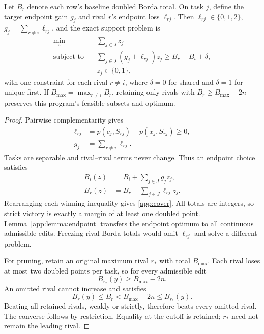 \begin{appprop}
\label{app:prop:borda}
Let $B_r$ denote each row's baseline doubled Borda total. On task $j$, define the target endpoint gain $g_j$ and rival $r$'s endpoint loss $\ell_{rj}$. Then $\ell_{rj}\in\{0,1,2\}$, $g_j=\sum_{r\ne i}\ell_{rj}$, and the exact support problem is
\begin{equation}
 \begin{aligned}
 \min_{z}\quad &\sum_{j\in J}z_j\\
 \text{subject to}\quad
 &\sum_{j\in J}(g_j+\ell_{rj})z_j
       \geq B_r-B_i+\delta,\\
 &z_j\in\{0,1\},
 \end{aligned}
 \label{app:cover}
\end{equation}
with one constraint for each rival $r\ne i$, where $\delta=0$ for shared and $\delta=1$ for unique first. If $B_{\max}=\max_{r\ne i}B_r$, retaining only rivals with $B_r\geq B_{\max}-2n$ preserves this program's feasible subsets and optimum.
\end{appprop}
\begin{proof}
Pairwise complementarity gives
\begin{align*}
 \ell_{rj}&=p(c_j,S_{rj})-p(x_j,S_{rj})\geq0,\\
 g_j&=\sum_{r\ne i}\ell_{rj}.
\end{align*}
Tasks are separable and rival--rival terms never change. Thus an endpoint choice satisfies
\begin{align*}
 B_i(z)&=B_i+\sum_{j\in J}g_jz_j,\\
 B_r(z)&=B_r-\sum_{j\in J}\ell_{rj}z_j.
\end{align*}
Rearranging each winning inequality gives \eqref{app:cover}. All totals are integers, so strict victory is exactly a margin of at least one doubled point. Lemma~\ref{app:lemma:endpoint} transfers the endpoint optimum to all continuous admissible edits. Freezing rival Borda totals would omit $\ell_{rj}$ and solve a different problem.

For pruning, retain an original maximum rival $r_*$ with total $B_{\max}$. Each rival loses at most two doubled points per task, so for every admissible edit
\[
 B_{r_*}(y)\geq B_{\max}-2n.
\]
An omitted rival cannot increase and satisfies
\[
 B_r(y)\leq B_r<B_{\max}-2n\leq B_{r_*}(y).
\]
Beating all retained rivals, weakly or strictly, therefore beats every omitted rival. The converse follows by restriction. Equality at the cutoff is retained; $r_*$ need not remain the leading rival.
\end{proof}

